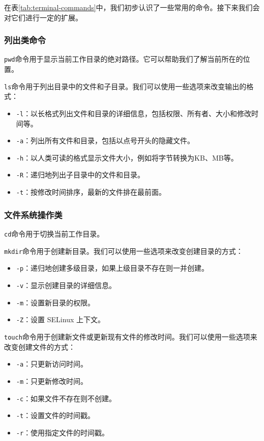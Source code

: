 \documentclass[../main.tex]{subfiles}
\begin{document}
在表\ref{tab:terminal-commands}中，我们初步认识了一些常用的命令。接下来我们会对它们进行一定的扩展。

\subsubsection{列出类命令}

\texttt{pwd}命令用于显示当前工作目录的绝对路径。它可以帮助我们了解当前所在的位置。

\texttt{ls}命令用于列出目录中的文件和子目录。我们可以使用一些选项来改变输出的格式：

\begin{itemize}
    \item \texttt{-l}：以长格式列出文件和目录的详细信息，包括权限、所有者、大小和修改时间等。
    \item \texttt{-a}：列出所有文件和目录，包括以点号开头的隐藏文件。
    \item \texttt{-h}：以人类可读的格式显示文件大小，例如将字节转换为KB、MB等。
    \item \texttt{-R}：递归地列出子目录中的文件和目录。
    \item \texttt{-t}：按修改时间排序，最新的文件排在最前面。
\end{itemize}

\subsubsection{文件系统操作类}

\texttt{cd}命令用于切换当前工作目录。

\texttt{mkdir}命令用于创建新目录。我们可以使用一些选项来改变创建目录的方式：
\begin{itemize}
    \item \texttt{-p}：递归地创建多级目录，如果上级目录不存在则一并创建。
    \item \texttt{-v}：显示创建目录的详细信息。
    \item \texttt{-m}：设置新目录的权限。
    \item \texttt{-Z}：设置 SELinux 上下文。
\end{itemize}

\texttt{touch}命令用于创建新文件或更新现有文件的修改时间。我们可以使用一些选项来改变创建文件的方式：
\begin{itemize}
    \item \texttt{-a}：只更新访问时间。
    \item \texttt{-m}：只更新修改时间。
    \item \texttt{-c}：如果文件不存在则不创建。
    \item \texttt{-t}：设置文件的时间戳。
    \item \texttt{-r}：使用指定文件的时间戳。
\end{itemize}
\end{document}
